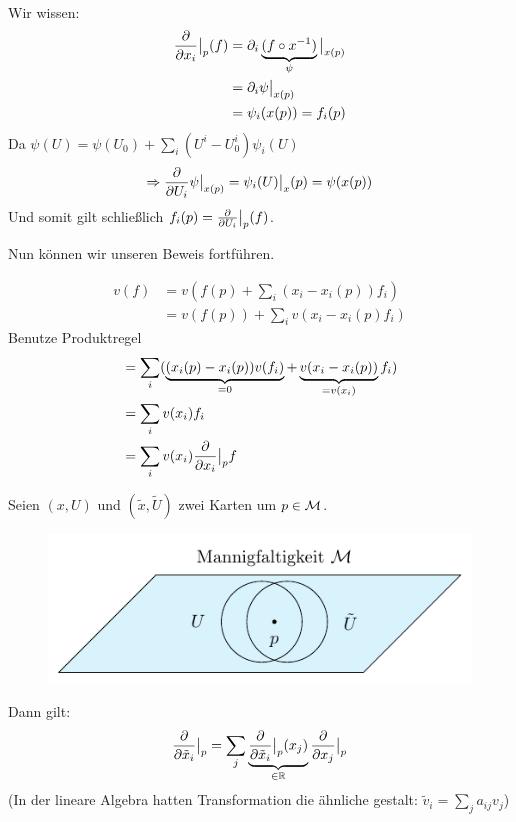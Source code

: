 \begin{bew}
\begin{align}
\end{align}
Wir wissen:
\begin{align}
\pdv{x_i}\big\vert_{p} (f) &= \partial_i \underbrace{(f \circ x^{-1})}_{\psi} \big \vert_{x(p)} \\
&= \partial_i \psi \big\vert_{x(p)}\\
&= \psi_i (x(p)) = f_i (p)
\end{align}
Da $\psi(U) = \psi(U_0) + \sum_i (U^i - U^i_0)\psi_i(U)$
\begin{align}
\Rightarrow \pdv{U_i} \psi \big\vert_{x(p)} = \psi_i(U) \big\vert_x(p) = \psi(x(p))
\end{align}
Und somit gilt schließlich $f_i (p) = \pdv{U_i} \big\vert_p (f)$.
\end{bew}

Nun können wir unseren Beweis fortführen.

\begin{bew} \leavevmode
\begin{align}
v(f) &= v(f(p) + \sum_i (x_i - x_i(p)) f_i) \\
&= v(f(p)) + \sum_i v(x_i - x_i (p) f_i)
\end{align}
Benutze Produktregel
\begin{align}
&= \sum_i (\underbrace{(x_i (p) - x_i (p)) v(f_i)}_{=0} + \underbrace{v(x_i - x_i (p))}_{=v(x_i)} f_i) \\
&= \sum_i v(x_i) f_i \\
&= \sum_i v(x_i) \pdv{x_i} \big\vert_p f 
\end{align}
\end{bew}


\begin{satz}[Transformationsregel]
Seien $(x, U)$ und $(\tilde{x}, \tilde{U})$ zwei Karten um $p \in \mathcal{M}$. 
\begin{figure}[H]
\centering
\includegraphics[scale=0.8]{figures/tikz/transformationlaw.pdf}
\label{img:transformationsregel}
\end{figure} 

Dann gilt:
\begin{align}
\pdv{\tilde{x}_i} \big\vert_p  = \sum_j \underbrace{\pdv{\tilde{x}_i} \big\vert_p  (x_j)}_{\in \mathbb{R}} \pdv{x_j} \big\vert_p 
\end{align}
(In der lineare Algebra hatten Transformation die ähnliche gestalt: $\tilde{v}_i = \sum_j a_{i j } v_j$)
\end{satz}


